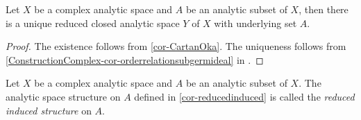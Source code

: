 \begin{corollary}\label{cor-reducedinduced}
    Let $X$ be a complex analytic space and $A$ be an analytic subset of $X$, then there is a unique reduced closed analytic space $Y$ of $X$ with underlying set $A$.
\end{corollary}
\begin{proof}
    The existence follows from \cref{cor-CartanOka}. The uniqueness follows from \cref{ConstructionComplex-cor-orderrelationsubgermideal} in .
\end{proof}

\begin{definition}
    Let $X$ be a complex analytic space and $A$ be an analytic subset of $X$. The analytic space structure on $A$ defined in \cref{cor-reducedinduced} is called the \emph{reduced induced structure} on $A$.
\end{definition}





\cite{stacks-project}

\printbibliography
